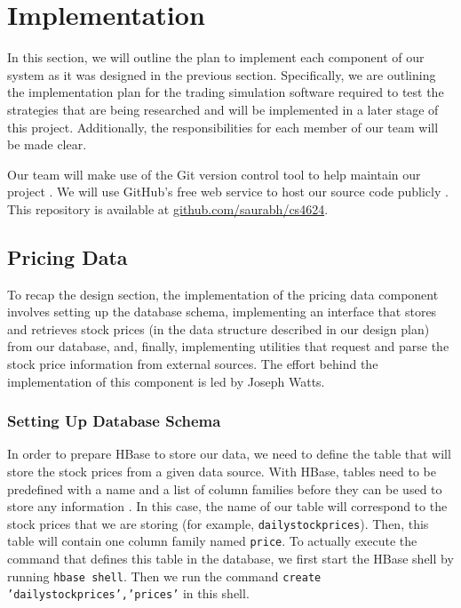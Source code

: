 
\section{Implementation}

In this section, we will outline the plan to implement each component of our system as it was designed in the previous section.
Specifically, we are outlining the implementation plan for the trading simulation software required to test the strategies that are being researched and will be implemented in a later stage of this project.
Additionally, the responsibilities for each member of our team will be made clear.

Our team will make use of the Git version control tool to help maintain our project \cite{git}.
We will use GitHub's free web service to host our source code publicly \cite{github}.
This repository is available at \url{github.com/saurabh/cs4624}.

\subsection{Pricing Data}

To recap the design section, the implementation of the pricing data component involves setting up the database schema, implementing an interface that stores and retrieves stock prices (in the data structure described in our design plan) from our database, and, finally, implementing utilities that request and parse the stock price information from external sources.
The effort behind the implementation of this component is led by Joseph Watts.

\subsubsection{Setting Up Database Schema}

In order to prepare HBase to store our data, we need to define the table that will store the stock prices from a given data source.
With HBase, tables need to be predefined with a name and a list of column families before they can be used to store any information \cite{hbase}.
In this case, the name of our table will correspond to the stock prices that we are storing (for example, \texttt{dailystockprices}).
Then, this table will contain one column family named \texttt{price}.
To actually execute the command that defines this table in the database, we first start the HBase shell by running \texttt{hbase shell}.
Then we run the command \texttt{create 'dailystockprices','prices'} in this shell.

